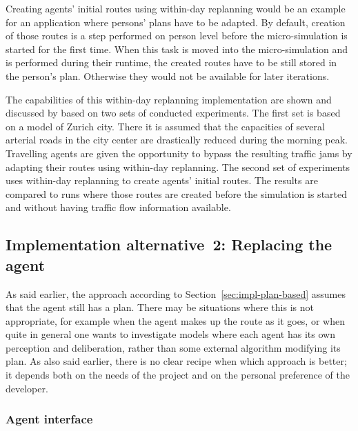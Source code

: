 Creating agents' initial routes using within-day replanning would be an example for an application where persons' plans have to be adapted. By default, creation of those routes is a step performed on person level before the micro-simulation is started for the first time. When this task is moved into the micro-simulation and is performed during their runtime, the created routes have to be still stored in the person's plan. Otherwise they would not be available for later iterations.


The capabilities of this within-day replanning implementation are shown and discussed by \citet{Dobler_PhDThesis_2013} based on two sets of conducted experiments. The first set is based on a model of Zurich city. There it is assumed that the capacities of several arterial roads in the city center are drastically reduced during the morning peak. Travelling agents are given the opportunity to bypass the resulting traffic jams by adapting their routes using within-day replanning. The second set of experiments uses within-day replanning to create agents' initial routes. The results are compared to runs where those routes are created before the simulation is started and without having traffic flow information available.

\subsection{Implementation alternative~2: Replacing the agent}
\label{sec:impl-repl-the-ag}

As said earlier, the approach according to Section~\ref{sec:impl-plan-based} assumes that the agent still has a plan.  There may be situations where this is not appropriate, for example when the agent makes up the route as it goes, or when quite in general one wants to investigate models where each agent has its own perception and deliberation, rather than some external algorithm modifying its plan.  As also said earlier, there is no clear recipe when which approach is better; it depends both on the needs of the project and on the personal preference of the developer.

\subsubsection{Agent interface}


